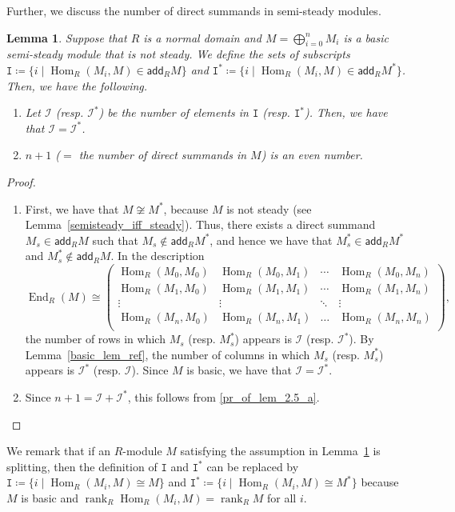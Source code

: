 \documentclass[11pt]{amsart}
\newtheorem{lemm}[theo]{Lemma}
\theoremstyle{definition}
\newcommand{\calI}{\mathcal{I}}
\newcommand{\ttI}{\mathtt{I}}
\DeclareMathOperator{\rank}{rank}
\DeclareMathOperator{\Hom}{Hom}
\DeclareMathOperator{\End}{End}
\newcommand{\add}{\mathsf{add}}
\begin{document}
Further, we discuss the number of direct summands in semi-steady modules.

\begin{lemm}\label{number_lem}
Suppose that $R$ is a normal domain and $M=\bigoplus_{i=0}^nM_i$ is a basic semi-steady module that is not steady. We define the sets of subscripts $\ttI\coloneqq\{i \mid \Hom_R(M_i,M)\in \add_RM\}$ and $\ttI^*\coloneqq\{i \mid \Hom_R(M_i,M)\in \add_RM^*\}$. Then, we have the following.
\begin{enumerate}%
\item\label{lem2-5_a} Let $\calI$ (resp. $\calI^*$) be the number of elements in $\ttI$ (resp. $\ttI^*$). Then, we have that $\calI=\calI^*$.
\item\label{lem2-5_b} $n+1$ ($=$ the number of direct summands in $M$) is an even number.
\end{enumerate}
\end{lemm}

\begin{proof}\ 

\begin{enumerate}%
\item\label{pr_of_lem_2.5_a}
First, we have that $M\not\cong M^*$, because $M$ is not steady (see Lemma~\ref{semisteady_iff_steady}). Thus, there exists a direct summand $M_s\in\add_RM$ such that $M_s\not\in\add_RM^*$, and hence we have that $M_s^*\in\add_RM^*$ and $M_s^*\not\in\add_RM$. In the description
\[
\End_R(M)\cong
\begin{pmatrix}
\Hom_R(M_0,M_0)&\Hom_R(M_0,M_1)&\cdots&\Hom_R(M_0,M_n) \\
\Hom_R(M_1,M_0)&\Hom_R(M_1,M_1)&\cdots&\Hom_R(M_1,M_n) \\
\vdots&\vdots&\ddots&\vdots \\
\Hom_R(M_n,M_0)&\Hom_R(M_n,M_1)&\dots&\Hom_R(M_n,M_n) \\
\end{pmatrix},
\]
the number of rows in which $M_s$ (resp. $M_s^*$) appears is $\calI$ (resp. $\calI^*$). By Lemma~\ref{basic_lem_ref}, the number of columns in which $M_s$ (resp. $M_s^*$) appears is $\calI^*$ (resp. $\calI$). Since $M$ is basic, we have that $\calI=\calI^*$.

\item\label{pr_of_lem_2.5_b}
Since $n+1=\calI+\calI^*$, this follows from \eqref{pr_of_lem_2.5_a}.\qedhere
\end{enumerate}
\end{proof}

We remark that if an $R$-module $M$ satisfying the assumption in Lemma~\ref{number_lem} is splitting, then the definition of $\ttI$ and $\ttI^*$ can be replaced by $\ttI\coloneqq\{i \mid \Hom_R(M_i,M)\cong M\}$ and $\ttI^*\coloneqq\{i \mid \Hom_R(M_i,M)\cong M^*\}$ because $M$ is basic and $\rank_R\Hom_R(M_i,M)=\rank_RM$ for all $i$.
\end{document}
